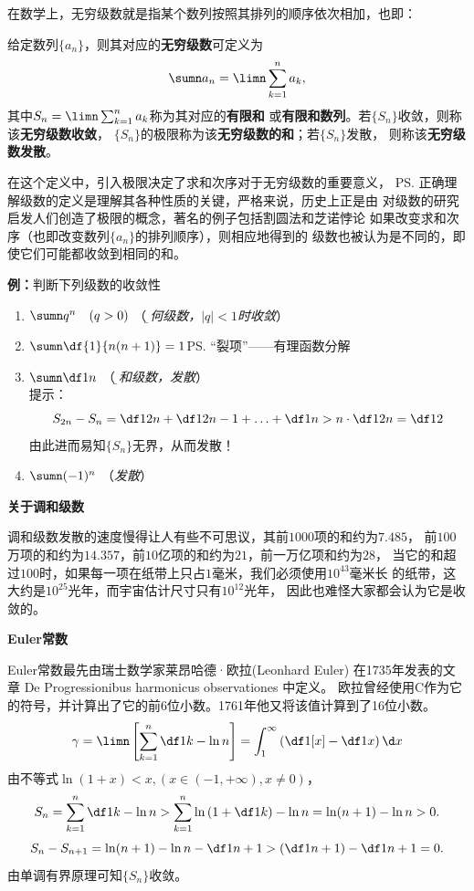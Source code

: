 在数学上，无穷级数就是指{\kaishu 某个数列按照其排列的顺序依次相加}，也即：
\begin{thx}
	给定数列$\{a_n\}$，则其对应的{\bf 无穷级数}可定义为
	$$\sumn a_n=\limn\sum_{k=1}^na_k,$$
	其中$S_n=\limn\sum_{k=1}^na_k$称为其对应的{\bf 有限和}
	或{\bf 有限和数列}。若$\{S_n\}$收敛，则称该{\bf 无穷级数收敛}，
	$\{S_n\}$的极限称为该{\bf 无穷级数的和}；若$\{S_n\}$发散，
	则称该{\bf 无穷级数发散}。
\end{thx}

在这个定义中，引入极限决定了求和次序对于无穷级数的重要意义，
\ps{正确理解级数的定义是理解其各种性质的关键，严格来说，历史上正是由
对级数的研究启发人们创造了极限的概念，著名的例子包括割圆法和芝诺悖论}
如果改变求和次序（也即改变数列$\{a_n\}$的排列顺序），则相应地得到的
级数也被认为是不同的，即使它们可能都收敛到相同的和。

{\bf 例：}判断下列级数的收敛性
\begin{enumerate}[(1)]
  \setlength{\itemindent}{1cm}
  \item $\sumn q^n\quad (q>0)$ \quad（{\it\b 几何级数，$|q|<1$时收敛}） 
  \item $\sumn\df{1}{n(n+1)}=1$\quad\ps{“裂项”——有理函数分解}
  \item $\sumn\df 1n$ \quad（{\it\b 调和级数，发散}）\\ 
  提示：$$S_{2n}-S_n=\df1{2n}+\df1{2n-1}+\ldots+\df1n
  >n\cdot\df1{2n}=\df12$$
  由此进而易知$\{S_n\}$无界，从而发散！
  \item $\sumn (-1)^n$ \quad（{\it 发散}）
\end{enumerate}

\begin{shaded}
{\bf 关于调和级数}

调和级数发散的速度慢得让人有些不可思议，其前$1000$项的和约为$7.485$，
前$100$万项的和约为$14.357$，前$10$亿项的和约为$21$，前一万亿项和约为$28$，
当它的和超过$100$时，如果每一项在纸带上只占$1$毫米，我们必须使用$10^{43}$毫米长
的纸带，这大约是$10^{25}$光年，而宇宙估计尺寸只有$10^{12}$光年，
因此也难怪大家都会认为它是收敛的。

{\bf Euler常数}

Euler常数最先由瑞士数学家莱昂哈德·欧拉(Leonhard Euler)
在1735年发表的文章 De Progressionibus harmonicus observationes 中定义。
欧拉曾经使用C作为它的符号，并计算出了它的前6位小数。1761年他又将该值计算到了16位小数。
$$\gamma=\limn\left[\sum\limits_{k=1}^n\df1k-\ln n\right]
=\int_1^{\infty}\left(\df1{[x]}-\df1x\right)\d x$$
由不等式$\ln(1+x)<x,(x\in(-1,+\infty),x\ne 0)$，
$$S_n=\sum\limits_{k=1}^n\df1k-\ln n>\sum\limits_{k=1}^n
\ln\left(1+\df1k\right)-\ln n=\ln(n+1)-\ln n>0.$$
$$S_n-S_{n+1}=\ln(n+1)-\ln n-\df1{n+1}>\left(\df1{n+1}\right)
-\df1{n+1}=0.$$
由单调有界原理可知$\{S_n\}$收敛。
\end{shaded}

